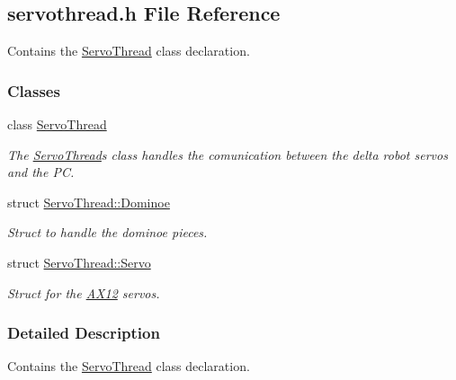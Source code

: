 \hypertarget{a00024}{}\subsection{servothread.\+h File Reference}
\label{a00024}


Contains the \hyperlink{a00009}{Servo\+Thread} class declaration.  


\subsubsection*{Classes}
\begin{DoxyCompactItemize}
\item 
class \hyperlink{a00009}{Servo\+Thread}
\begin{DoxyCompactList}\small\item\em The \hyperlink{a00009}{Servo\+Thread}\textquotesingle{}s class handles the comunication between the delta robot servos and the P\+C. \end{DoxyCompactList}\item 
struct \hyperlink{a00002}{Servo\+Thread\+::\+Dominoe}
\begin{DoxyCompactList}\small\item\em Struct to handle the dominoe pieces. \end{DoxyCompactList}\item 
struct \hyperlink{a00007}{Servo\+Thread\+::\+Servo}
\begin{DoxyCompactList}\small\item\em Struct for the \hyperlink{a00001}{A\+X12} servos. \end{DoxyCompactList}\end{DoxyCompactItemize}


\subsubsection{Detailed Description}
Contains the \hyperlink{a00009}{Servo\+Thread} class declaration. 

